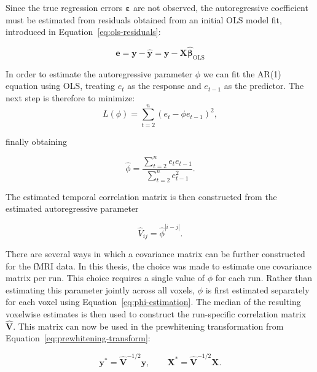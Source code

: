 \documentclass[english]{pwr_wmat_praca_dyplomowa}
\theoremstyle{definition}
\theoremstyle{remark}
\begin{document}
Since the true regression errors $\boldsymbol{\varepsilon}$ are not observed, the autoregressive coefficient must be estimated from residuals obtained from an initial OLS model fit, introduced in Equation~\eqref{eq:ols-residuals}:

\begin{equation}
    \mathbf{e} = \mathbf{y}-\widehat{\mathbf{y}} = \mathbf{y} - \mathbf{X}\widehat{\boldsymbol{\beta}}_{\mathrm{OLS}}
\end{equation}

In order to estimate the autoregressive parameter $\phi$ we can fit the AR(1) equation using OLS, treating $e_t$ as the response and $e_{t-1}$ as the predictor. The next step is therefore to minimize:
\begin{equation}
    L(\phi) = \sum_{t=2}^{n} (e_t - \phi e_{t-1})^2,
\end{equation}

finally obtaining

\begin{equation}
    \widehat{\phi} = \frac{\sum_{t=2}^{n} e_t e_{t-1} }{\sum_{t=2}^{n}e_{t-1}^2}.
    \label{eq:phi-estimation}
\end{equation}

\newpage
The estimated temporal correlation matrix is then constructed from the estimated autoregressive parameter

\begin{equation}
    \widehat{V}_{ij} = \widehat{\phi}^{|i-j|}.
    \label{eq:estimated-ar1-covariance}
\end{equation}

There are several ways in which a covariance matrix can be further constructed for the fMRI data. In this thesis, the choice was made to estimate one covariance matrix per run. This choice requires a single value of $\phi$ for each run. Rather than estimating this parameter jointly across all voxels, $\phi$ is first estimated separately for each voxel using Equation~\eqref{eq:phi-estimation}. The median of the resulting voxelwise estimates is then used to construct the run-specific correlation matrix $\widehat{\mathbf V}$. This matrix can now be used in the prewhitening transformation from Equation~\eqref{eq:prewhitening-transform}:

\begin{equation}
    \mathbf{y}^{\ast} = \widehat{\mathbf{V}}^{-1/2}\mathbf{y}, \qquad \mathbf{X}^{\ast} = \widehat{\mathbf{V}}^{-1/2}\mathbf{X}.
\end{equation}
\end{document}

